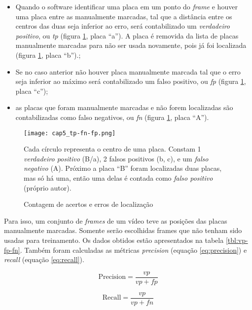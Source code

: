 \begin{itemize}

\item Quando o software identificar uma placa em um ponto do \emph{frame} e
	houver uma placa entre as manualmente marcadas, tal que a distância entre
	os centros  das duas seja inferior ao erro, será contabilizado um
	\emph{verdadeiro positivo}, ou \emph{tp} (figura \ref{fig:cap5_tp-fn-fp},
	placa ``a'').
	A placa é removida da lista de placas manualmente marcadas para não
	ser usada novamente, pois já foi localizada (figura
	\ref{fig:cap5_tp-fn-fp}, placa ``b'').;

\item Se no caso anterior não houver placa manualmente marcada tal que o erro
	seja inferior ao máximo será contabilizado um falso positivo, ou \emph{fp}
	(figura \ref{fig:cap5_tp-fn-fp}, placa ``c'');

\item as placas que foram manualmente marcadas e não forem localizadas são
	contabilizadas como falso negativos, ou \emph{fn} (figura
	\ref{fig:cap5_tp-fn-fp}, placa ``A'').

\end{itemize}


\begin{figure}[!htb]
	\centering
	\texttt{[image: cap5\_tp-fn-fp.png]}
	\caption{Contagem de acertos e erros de localização}
	\label{fig:cap5_tp-fn-fp}
	Cada círculo representa o centro de uma placa. Constam 1 \emph{verdadeiro
	positivo} (B/a), 2 falsos positivos (b, c), e um \emph{falso negativo} (A).
	Próximo a placa ``B'' foram localizadas duas placas, mas
	só há uma, então uma delas é contada como \emph{falso positivo}
	(próprio autor).
\end{figure}

Para isso, um conjunto de \emph{frames} de um vídeo teve as posições das placas
manualmente marcadas. Somente serão escolhidas frames que não tenham sido
usadas para treinamento. Os dados obtidos estão apresentados na tabela
\ref{tbl:vp-fp-fn}. Também foram calculadas as métricas \emph{precision}
(equação \ref{eq:precision}) e \emph{recall} (equação \ref{eq:recall}).

\noindent\begin{minipage}{.5\linewidth}
	\begin{equation} \label{eq:precision}
		\text{Precision} = \frac{vp}{vp + fp}
	\end{equation}
\end{minipage}
\begin{minipage}{.5\linewidth}
	\begin{equation} \label{eq:recall}
		\text{Recall} = \frac{vp}{vp + fn}
	\end{equation}
\end{minipage}

